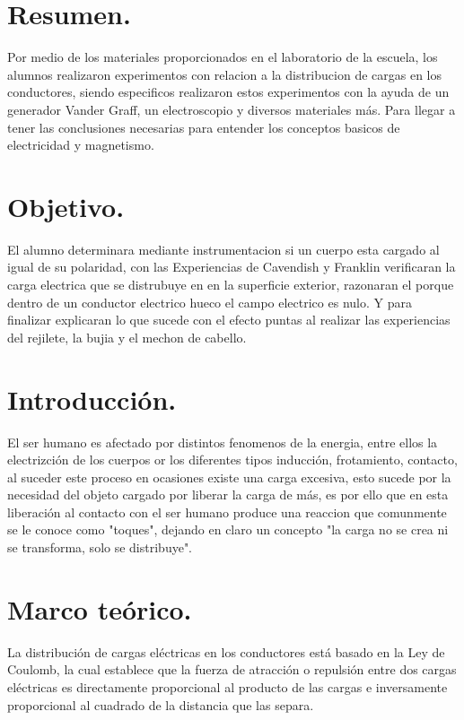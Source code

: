 \documentclass[10pt]{article}
\begin{document}
\tableofcontents
\newpage




\section{Resumen.}
Por medio de los materiales proporcionados en el laboratorio de la escuela, los alumnos realizaron experimentos con relacion a la distribucion de cargas en los conductores, siendo especificos realizaron estos experimentos con la ayuda de un generador Vander Graff, un electroscopio y diversos materiales más. Para llegar a tener las conclusiones necesarias para entender los conceptos basicos de electricidad y magnetismo.

\begin{multicols}{2}
\section{Objetivo.}
El alumno determinara mediante instrumentacion si un cuerpo esta cargado al igual de su polaridad, con las Experiencias de Cavendish y Franklin verificaran la carga electrica que se distrubuye en en la superficie exterior, razonaran el porque dentro de un conductor electrico hueco el campo electrico es nulo. Y para finalizar explicaran lo que sucede con el efecto puntas al realizar las experiencias del rejilete, la bujia y el mechon de cabello.

\section{Introducción.}
El ser humano es afectado por distintos fenomenos de la energia, entre ellos la electrizción de los cuerpos or los diferentes tipos inducción, frotamiento, contacto, al suceder este proceso en ocasiones existe una carga excesiva, esto sucede por la necesidad del objeto cargado por liberar la carga de más, es por ello que en esta liberación al contacto con el ser humano produce una reaccion que comunmente se le conoce como "toques", dejando en claro un concepto "la carga no se crea ni se transforma, solo se distribuye". 


\section{Marco teórico.}
La distribución de cargas eléctricas en los conductores está basado en la Ley de Coulomb, la cual establece que la fuerza de atracción o repulsión entre dos cargas eléctricas es directamente proporcional al producto de las cargas e inversamente proporcional al cuadrado de la distancia que las separa.


\end{multicols}
\end{document}
